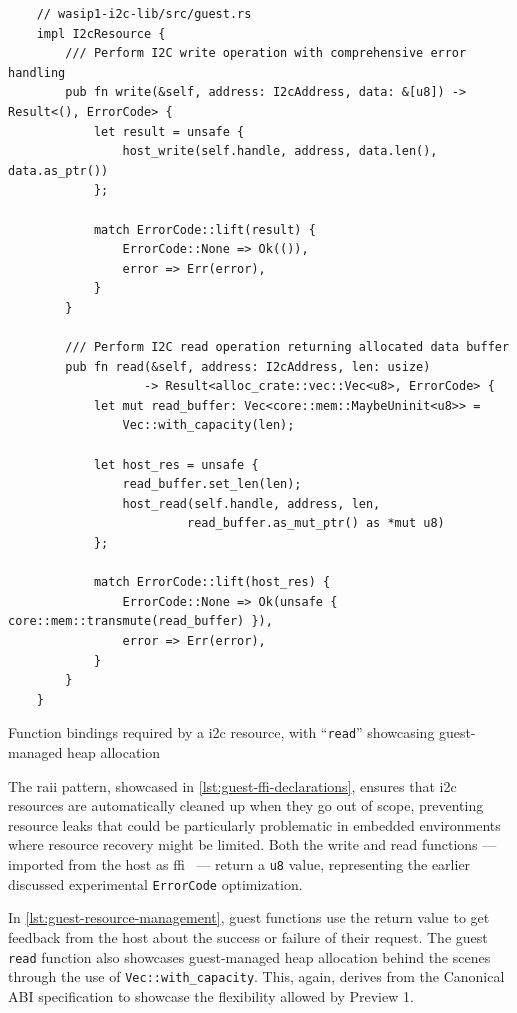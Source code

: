 \begin{listing}[H]
    \begin{verbatim}
    // wasip1-i2c-lib/src/guest.rs
    impl I2cResource {
        /// Perform I2C write operation with comprehensive error handling
        pub fn write(&self, address: I2cAddress, data: &[u8]) -> Result<(), ErrorCode> {
            let result = unsafe {
                host_write(self.handle, address, data.len(), data.as_ptr())
            };
            
            match ErrorCode::lift(result) {
                ErrorCode::None => Ok(()),
                error => Err(error),
            }
        }
    
        /// Perform I2C read operation returning allocated data buffer
        pub fn read(&self, address: I2cAddress, len: usize) 
                   -> Result<alloc_crate::vec::Vec<u8>, ErrorCode> {
            let mut read_buffer: Vec<core::mem::MaybeUninit<u8>> = 
                Vec::with_capacity(len);
    
            let host_res = unsafe {
                read_buffer.set_len(len);
                host_read(self.handle, address, len, 
                         read_buffer.as_mut_ptr() as *mut u8)
            };
    
            match ErrorCode::lift(host_res) {
                ErrorCode::None => Ok(unsafe { core::mem::transmute(read_buffer) }),
                error => Err(error),
            }
        }
    }
    \end{verbatim}
    \caption{Function bindings required by a \acrshort{i2c} resource, with ``\texttt{read}'' showcasing guest-managed heap allocation}
    \label{lst:guest-resource-management}
\end{listing}

The \acrshort{raii} pattern, showcased in \autoref{lst:guest-ffi-declarations}, ensures that \acrshort{i2c} resources are automatically cleaned up when they go out of scope, preventing resource leaks that could be particularly problematic in embedded environments where resource recovery might be limited. Both the write and read functions --- imported from the host as \acrfull{ffi}~\cite{ffi_wiki} --- return a \texttt{u8} value, representing the earlier discussed experimental \texttt{ErrorCode} optimization.

In \autoref{lst:guest-resource-management}, guest functions use the return value to get feedback from the host about the success or failure of their request. The guest \texttt{read} function also showcases guest-managed heap allocation behind the scenes through the use of \texttt{Vec::with\_capacity}. This, again, derives from the Canonical ABI specification to showcase the flexibility allowed by Preview 1.

